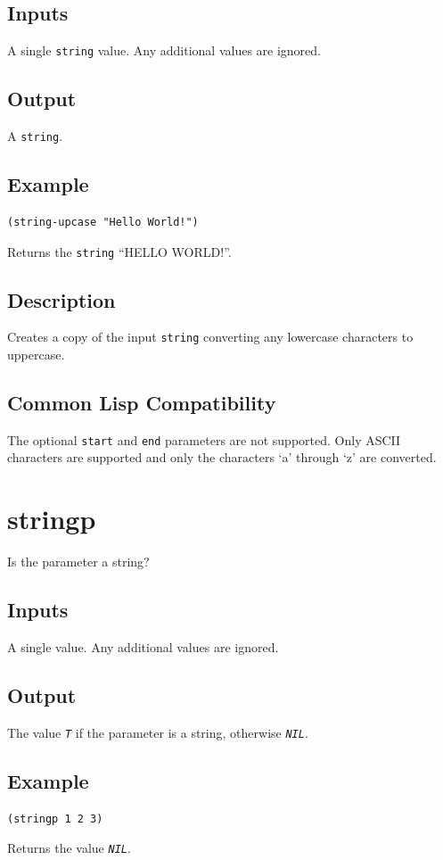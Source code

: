 \documentclass[10pt, openany]{book}
\newcommand{\constant}[1]{\emph{\texttt{#1}}}
\newcommand{\keyword}[1]{\texttt{#1}}
\newcommand{\datatype}[1]{\texttt{#1}}
\begin{document}
\subsection{Inputs}
A single \datatype{string} value.  Any additional values are ignored.
\subsection{Output}
A \datatype{string}.
\subsection{Example}
\begin{lstlisting}
(string-upcase "Hello World!")
\end{lstlisting}
Returns the \datatype{string} ``HELLO WORLD!''.
\subsection{Description}
Creates a copy of the input \datatype{string} converting any lowercase characters to uppercase.
\subsection{Common Lisp Compatibility}
The optional \keyword{start} and \keyword{end} parameters are not supported.  Only ASCII characters are supported and only the characters `a' through `z' are converted.

\section{stringp}
Is the parameter a string?
\subsection{Inputs}
A single value.  Any additional values are ignored.
\subsection{Output}
The value \constant{T} if the parameter is a string, otherwise \constant{NIL}.
\subsection{Example}
\begin{lstlisting}
(stringp 1 2 3)
\end{lstlisting}
Returns the value \constant{NIL}.
\end{document}
